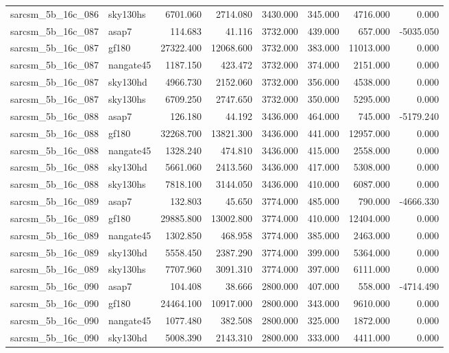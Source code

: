 \begin{tabular}{llrrrrrr}
sarcsm\_5b\_16c\_086 & sky130hs & 6701.060 & 2714.080 & 3430.000 & 345.000 & 4716.000 & 0.000 \\
sarcsm\_5b\_16c\_087 & asap7 & 114.683 & 41.116 & 3732.000 & 439.000 & 657.000 & -5035.050 \\
sarcsm\_5b\_16c\_087 & gf180 & 27322.400 & 12068.600 & 3732.000 & 383.000 & 11013.000 & 0.000 \\
sarcsm\_5b\_16c\_087 & nangate45 & 1187.150 & 423.472 & 3732.000 & 374.000 & 2151.000 & 0.000 \\
sarcsm\_5b\_16c\_087 & sky130hd & 4966.730 & 2152.060 & 3732.000 & 356.000 & 4538.000 & 0.000 \\
sarcsm\_5b\_16c\_087 & sky130hs & 6709.250 & 2747.650 & 3732.000 & 350.000 & 5295.000 & 0.000 \\
sarcsm\_5b\_16c\_088 & asap7 & 126.180 & 44.192 & 3436.000 & 464.000 & 745.000 & -5179.240 \\
sarcsm\_5b\_16c\_088 & gf180 & 32268.700 & 13821.300 & 3436.000 & 441.000 & 12957.000 & 0.000 \\
sarcsm\_5b\_16c\_088 & nangate45 & 1328.240 & 474.810 & 3436.000 & 415.000 & 2558.000 & 0.000 \\
sarcsm\_5b\_16c\_088 & sky130hd & 5661.060 & 2413.560 & 3436.000 & 417.000 & 5308.000 & 0.000 \\
sarcsm\_5b\_16c\_088 & sky130hs & 7818.100 & 3144.050 & 3436.000 & 410.000 & 6087.000 & 0.000 \\
sarcsm\_5b\_16c\_089 & asap7 & 132.803 & 45.650 & 3774.000 & 485.000 & 790.000 & -4666.330 \\
sarcsm\_5b\_16c\_089 & gf180 & 29885.800 & 13002.800 & 3774.000 & 410.000 & 12404.000 & 0.000 \\
sarcsm\_5b\_16c\_089 & nangate45 & 1302.850 & 468.958 & 3774.000 & 385.000 & 2463.000 & 0.000 \\
sarcsm\_5b\_16c\_089 & sky130hd & 5558.450 & 2387.290 & 3774.000 & 399.000 & 5364.000 & 0.000 \\
sarcsm\_5b\_16c\_089 & sky130hs & 7707.960 & 3091.310 & 3774.000 & 397.000 & 6111.000 & 0.000 \\
sarcsm\_5b\_16c\_090 & asap7 & 104.408 & 38.666 & 2800.000 & 407.000 & 558.000 & -4714.490 \\
sarcsm\_5b\_16c\_090 & gf180 & 24464.100 & 10917.000 & 2800.000 & 343.000 & 9610.000 & 0.000 \\
sarcsm\_5b\_16c\_090 & nangate45 & 1077.480 & 382.508 & 2800.000 & 325.000 & 1872.000 & 0.000 \\
sarcsm\_5b\_16c\_090 & sky130hd & 5008.390 & 2143.310 & 2800.000 & 333.000 & 4411.000 & 0.000 \\

\end{tabular}
